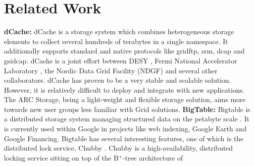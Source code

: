 \documentclass[final]{ieee}
\begin{document}
\section{Related Work}
\label{Related Work}
\textbf{dCache:} dCache is a storage system which combines heterogeneous storage
elements to collect several hundreds of terabytes in a single
namespace. It additionally supports standard and native
protocols like gridftp, srm, dcap and gsidcap. dCache is
a joint effort between DESY \cite{dCachesite}, Fermi National Accelerator Laboratory \cite{FermiLab}, the  Nordic Data
Grid Facility (NDGF) \cite{NDGF}  and several other collaborators. %
dCache has proven to be a very stable and scalable solution. However,
it is relatively difficult to deploy and integrate with new applications. 
The ARC Storage, being a light-weight and flexible
storage solution, aims more towards new user groups less familiar with
Grid solutions. 
\newline
\textbf{BigTable:} Bigtable is a distributed storage system managing structured data on
the petabyte scale \cite{Bigtable}. It is currently used within
Google in projects like web indexing, Google Earth and Google
Financing. %
Bigtable has several interesting features, one of which is the
distributed lock service, Chubby \cite{Chubby}. Chubby is a high-availability, distributed
locking service sitting on top of the B$^+$-tree architecture of
\end{document}
